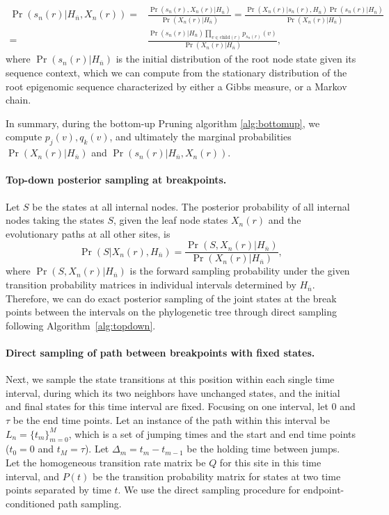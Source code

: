 \documentclass[11pt]{article}
\newcommand{\child}[1]{\ensuremath{\mathrm{child}(#1)}}
\begin{document}
\begin{equation} \label{eqn:rootposterior}
  \begin{aligned}
    \Pr(s_n(r)| H_{\overline{n}}, X_n(r)) = &
    \frac{\Pr(s_n(r), X_n(r) | H_{\overline{n}})}{\Pr(X_n(r) | H_{\overline{n}})} =
    \frac{\Pr(X_n(r) |s_n(r), H_{\overline{n}}) \Pr(s_n(r) | H_{\overline{n}})}{\Pr(X_n(r)| H_{\overline{n}}) }  \\
= & \frac{\Pr(s_n(r)|H_{\overline{n}}) \prod_{v\in \child{r}} p_{s_n(r)}(v)}{\Pr(X_n(r)| H_{\overline{n}}) },
\end{aligned}
\end{equation}
where $\Pr(s_n(r)|H_{\overline{n}})$ is the initial distribution of the root node
state given its sequence context, which we can compute from the
stationary distribution of the root epigenomic sequence characterized
by either a Gibbs measure, or a Markov chain.

In summary, during the bottom-up Pruning algorithm \ref{alg:bottomup},
we compute $p_j(v), q_k(v)$, and ultimately the marginal probabilities
$\Pr(X_n(r) | H_{\overline{n}})$ and $\Pr(s_n(r)|H_{\overline{n}},
X_n(r))$.

\paragraph{Top-down posterior sampling at breakpoints.}
Let $S$ be the states at all internal nodes. The posterior probability
of all internal nodes taking the states $S$, given the leaf node
states $X_n(r)$ and the evolutionary paths at all other sites, is
\[
\Pr(S | X_n(r), H_{\overline{n}}) = \frac{\Pr(S, X_n(r) | H_{\overline{n}}) }{\Pr(X_n(r) | H_{\overline{n}})},
\]
where $\Pr(S, X_n(r) | H_{\overline{n}}) $ is the forward sampling probability
under the given transition probability matrices in individual
intervals determined by $H_{\overline{n}}$.
Therefore, we can do exact posterior sampling of the joint states at
the break points between the intervals on the phylogenetic tree through
direct sampling following Algorithm~\ref{alg:topdown}.

\paragraph{Direct sampling of path between breakpoints with fixed states.}
Next, we sample the state transitions at this position within each
single time interval, during which its two neighbors have unchanged
states, and the initial and final states for this time interval are
fixed.  Focusing on one interval, let $0$ and $\tau$ be the end time
points.  Let an instance of the path within this interval be $L_n =
\{t_m\}_{m=0}^{M}$, which is a set of jumping times and the start and
end time points ($t_0 = 0$ and $t_M=\tau$). Let $\Delta_m = t_m -
t_{m-1}$ be the holding time between jumps. Let the homogeneous
transition rate matrix be $Q$ for this site in this time interval, and
$P(t)$ be the transition probability matrix for states at two time
points separated by time $t$. We use the direct sampling procedure
\cite{hobolth2009simulation} for endpoint-conditioned path sampling.
\end{document}

